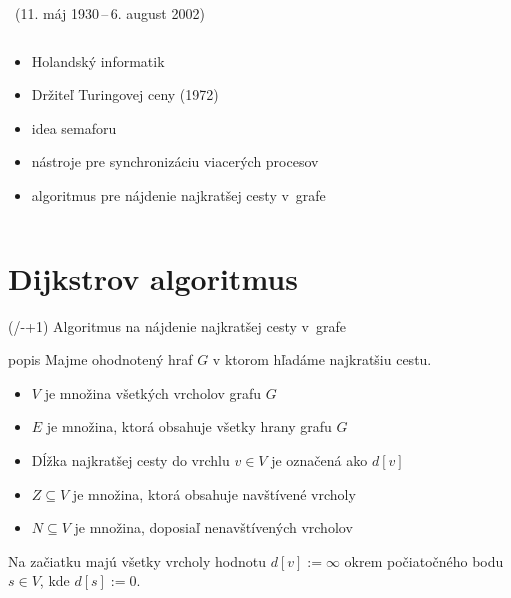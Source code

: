 \documentclass{beamer}
\newcounter{sectionslides}
\newcommand{\sectionslidenumber}{
  (\thesectionslides/\the\numexpr\insertsectionendpage-\insertsectionstartpage+1\relax)
}
\begin{document}
\begin{frame}[c]{\insertsectionhead~(11. máj 1930\,--\,6. august 2002)}
\begin{columns}[T]
		\begin{column}{0.5\textwidth}
			\begin{itemize}
				\vspace{12pt}
				\setlength{\itemsep}{12pt}
				\item Holandský informatik
				\item Držiteľ Turingovej ceny (1972)
				\item idea semaforu 
				\item nástroje pre synchronizáciu viacerých procesov
				\item algoritmus pre nájdenie najkratšej cesty v~grafe
			\end{itemize}
		\end{column}
	\end{columns}
\end{frame}


\section{Dijkstrov algoritmus}

\begin{frame}{{\insertsectionhead\sectionslidenumber}}
	Algoritmus na nájdenie najkratšej cesty v~grafe
	
	\begin{block}{popis}
		Majme ohodnotený hraf $G$ v ktorom hľadáme najkratšiu cestu.

		\begin{itemize}
			\item $V$ je množina všetkých vrcholov grafu $G$
			\item $E$ je množina, ktorá obsahuje všetky hrany grafu $G$
			\item Dĺžka najkratšej cesty do vrchlu $v \in V$ je označená ako $d[v]$
			\item $Z \subseteq V$ je množina, ktorá obsahuje navštívené vrcholy
			\item $N \subseteq V$ je množina, doposiaľ nenavštívených vrcholov
		\end{itemize}

		Na začiatku majú všetky vrcholy hodnotu $d[v] := \infty$ okrem počiatočného bodu $s \in V$, kde $d[s] := 0$.
	\end{block}
\end{frame}
\end{document}
